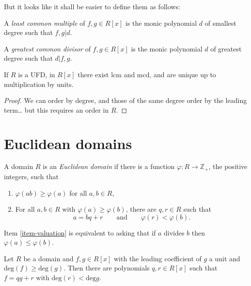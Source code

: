 But it looks like it shall be easier to define them
as follows:

\begin{definition}
\label{definition-lcm-and-gdc-polynomial}
A {\it least common multiple} of $f,g \in R[x]$ is the monic polynomial $d$ of
smallest degree such that $f,g|d$.

A {\it greatest common divisor} of $f,g\in R[x]$ is the monic polynomial $d$ of
greatest degree such that $d|f,g$.
\end{definition}

\begin{lemma}
\label{lemma-existence-of-lcm-and-gcd}
If $R$ is a UFD, in $R[x]$ there exist lcm and mcd, and are unique up to 
multiplication by units.
\end{lemma}

\begin{proof}
We can order by degree, and those of the same degree order by the leading
term… but this requires an order in $R$.
\end{proof}

\section{Euclidean domains}
\label{section-Euclidean-domains}

\begin{definition}
\label{definition-Euclidean-domain}
A domain $R$ is an {\it Euclidean domain} if there
is a function  $\varphi:R\to \mathbb{Z}_+$, the positive integers,
such that
\begin{enumerate}
\item $\varphi(ab)\geq \varphi(a)$ for all $a,b \in R$,
\label{item-valuation}
\item For all $a,b \in R$ with $\varphi(a) \geq \varphi(b)$,
there are $q,r \in R$ such that
$$
a=bq+r\qquad \text{and} \qquad\varphi(r)<\varphi(b).
$$
\end{enumerate}
\end{definition}

\begin{remark}
\label{remark-equivalence-for-valuation}
Item \ref{item-valuation} is equivalent to
asking that if $a$ divides $b$ then
$\varphi(a) \leq \varphi (b)$.
\end{remark}

\begin{theorem}
\label{theorem-Euclidean-algorithm-for-polynomial-rings}
Let $R$ be a domain and $f,g \in R[x]$
with the leading coefficient of $g$ a unit
and $\text{deg}(f)\geq \text{deg}(g)$. Then
there are polynomials $q,r \in R[x]$ such that
$f=qg+r$ with $\text{deg}(r)<\text{deg}g$.
\end{theorem}


